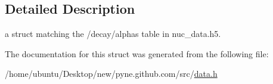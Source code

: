 \subsection{Detailed Description}
a struct matching the \textquotesingle{}/decay/alphas\textquotesingle{} table in nuc\+\_\+data.\+h5. 

The documentation for this struct was generated from the following file\+:\begin{DoxyCompactItemize}
\item 
/home/ubuntu/\+Desktop/new/pyne.\+github.\+com/src/\hyperlink{data_8h}{data.\+h}\end{DoxyCompactItemize}
